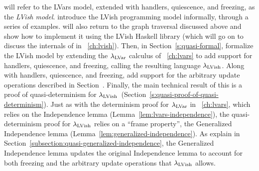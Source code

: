  will refer to the LVars model, extended with handlers, quiescence,
and freezing, as the \emph{LVish model}.   introduce
the LVish programming model informally, through a series of examples.
 will also return to the graph traversal  discussed above and show
how to implement it using the LVish Haskell library (which  will go
on to discuss the internals of in ~\ref{ch:lvish}).  Then, in
Section~\ref{s:quasi-formal},  formalize the LVish model by extending
the $\lambda_{\textrm{LVar}}$ calculus of ~\ref{ch:lvars} to add support
for handlers, quiescence, and freezing, calling the resulting language
$\lambda_{\textrm{LVish}}$.  Along with handlers, quiescence, and freezing,  add
support for the arbitrary update operations described in
Section~\either{\ref{subsection:lvars-generalizing-from-least-upper-bound-writes}}{\ref{s:lvars-generalizing}}.
Finally, the main technical result of this  is a proof of
quasi-determinism for
$\lambda_{\textrm{LVish}}$~(Section~\ref{s:quasi-proof-of-quasi-determinism}). Just
as with the determinism proof  for $\lambda_{\textrm{LVar}}$ in
~\ref{ch:lvars}, which relies on the Independence lemma
(Lemma~\ref{lem:lvars-independence}), the quasi-determinism proof for
$\lambda_{\textrm{LVish}}$ relies on a ``frame property'', the Generalized
Independence lemma (Lemma~\ref{lem:generalized-independence}).  As 
explain in Section~\ref{subsection:quasi-generalized-independence},
the Generalized Independence lemma updates the original Independence
lemma to account for both freezing and the arbitrary update operations
that $\lambda_{\textrm{LVish}}$ allows.
